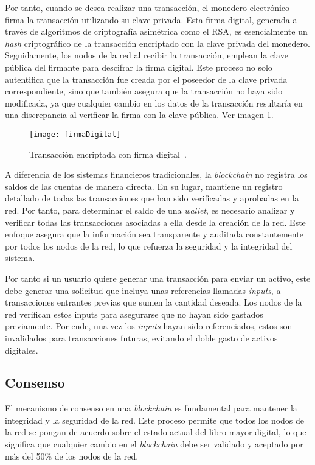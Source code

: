 Por tanto, cuando se desea realizar una transacción, el monedero electrónico firma la transacción utilizando su clave privada. Esta firma digital, generada a través de algoritmos de criptografía asimétrica como el RSA, es esencialmente un \textit{hash} criptográfico de la transacción encriptado con la clave privada del monedero.
Seguidamente, los nodos de la red al recibir la transacción, emplean la clave pública del firmante para descifrar la firma digital. Este proceso no solo autentifica que la transacción fue creada por el poseedor de la clave privada correspondiente, sino que también asegura que la transacción no haya sido modificada, ya que cualquier cambio en los datos de la transacción resultaría en una discrepancia al verificar la firma con la clave pública. Ver imagen \ref{img:firmaDigital}.

\begin{figure}[h]
	\label{img:firmaDigital}
	\centering
	\texttt{[image: firmaDigital]}
	\caption[Transacción blockchain]{Transacción encriptada con firma digital~\cite{BlockchainFuncionamiento}.}
\end{figure}

A diferencia de los sistemas financieros tradicionales, la \textit{blockchain} no registra los saldos de las cuentas de manera directa. En su lugar, mantiene un registro detallado de todas las transacciones que han sido verificadas y aprobadas en la red.
Por tanto, para determinar el saldo de una \textit{wallet}, es necesario analizar y verificar todas las transacciones asociadas a ella desde la creación de la red. Este enfoque asegura que la información sea transparente y auditada constantemente por todos los nodos de la red, lo que refuerza la seguridad y la integridad del sistema.

Por tanto si un usuario quiere generar una transacción para enviar un activo, este debe generar una solicitud que incluya unas referencias llamadas \textit{inputs}, a transacciones entrantes previas que sumen la cantidad deseada. Los nodos de la red verifican estos inputs para asegurarse que no hayan sido gastados previamente.
Por ende, una vez los \textit{inputs} hayan sido referenciados, estos son invalidados para transacciones futuras, evitando el doble gasto de activos digitales.


\subsection{Consenso}

El mecanismo de consenso en una \textit{blockchain} es fundamental para mantener la integridad y la seguridad de la red. Este proceso permite que todos los nodos de la red se pongan de acuerdo sobre el estado actual del libro mayor digital, lo que significa que cualquier cambio en el \textit{blockchain} debe ser validado y aceptado por más del 50\% de los nodos de la red.

